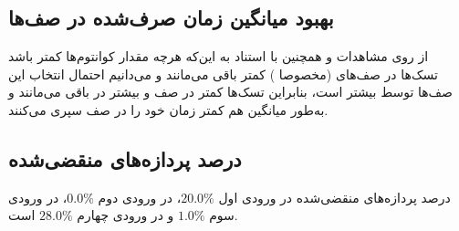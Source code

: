 \documentclass{article}
\begin{document}
\subsection{بهبود میانگین زمان صرف‌شده در صف‌ها}
از روی مشاهدات و همچنین با استناد به این‌که هرچه مقدار کوانتوم‌ها کمتر باشد تسک‌ها در صف‌های  (مخصوصا ) کمتر باقی می‌مانند و می‌دانیم احتمال انتخاب این صف‌ها توسط  بیشتر است، بنابراین تسک‌ها کمتر در صف  و بیشتر در  باقی می‌مانند و به‌طور میانگین هم کمتر زمان خود را در صف سپری می‌کنند.

\subsection{درصد پردازه‌های منقضی‌شده}
درصد پردازه‌های منقضی‌شده در ورودی اول $20.0\%$، در ورودی دوم $0.0\%$، در ورودی سوم $1.0\%$ و در ورودی چهارم $28.0\%$ است.
\end{document}
